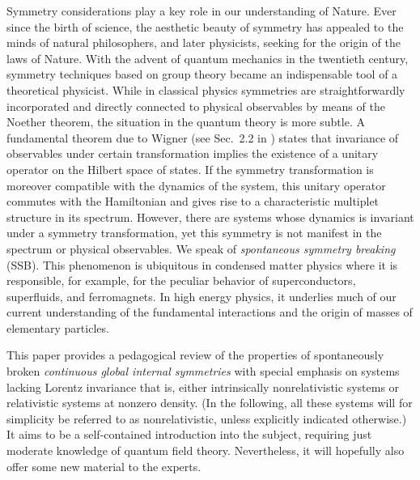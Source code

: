 \documentclass[final,3p,times,12pt,a4paper,sort&compress]{elsarticle}
\begin{document}
Symmetry considerations play a key role in our understanding of Nature. Ever
since the birth of science, the aesthetic beauty of symmetry has appealed to
the minds of natural philosophers, and later physicists, seeking for the origin
of the laws of Nature. With the advent of quantum mechanics in the twentieth
century, symmetry techniques based on group theory became an indispensable tool
of a theoretical physicist. While in classical physics symmetries are
straightforwardly incorporated and directly connected to physical observables
by means of the Noether theorem, the situation in the quantum theory is more
subtle. A fundamental theorem due to Wigner (see Sec.~2.2 in
\cite{Weinberg:1995v1}) states that
invariance of observables under certain transformation implies the existence of
a unitary operator on the Hilbert space of states. If the symmetry
transformation is moreover compatible with the dynamics of the system, this
unitary operator commutes with the Hamiltonian and gives rise to a
characteristic multiplet structure in its spectrum. However, there are systems
whose dynamics is invariant under a symmetry transformation, yet this symmetry
is not manifest in the spectrum or physical observables. We speak of
\emph{spontaneous symmetry breaking} (SSB). This phenomenon is ubiquitous in
condensed matter physics where it is responsible, for example, for the peculiar
behavior of superconductors, superfluids, and ferromagnets. In high energy
physics, it underlies much of our current understanding of the fundamental
interactions and the origin of masses of elementary particles.

This paper provides a pedagogical review of the properties of spontaneously
broken \emph{continuous global internal symmetries} with special emphasis on
systems lacking Lorentz invariance that is, either intrinsically nonrelativistic
systems or relativistic systems at nonzero density. (In the following, all
these systems will for simplicity be referred to as nonrelativistic, unless
explicitly indicated otherwise.) It aims to be a self-contained introduction
into the subject, requiring just moderate knowledge of quantum field theory.
Nevertheless, it will hopefully also offer some new material to the experts.
\end{document}
